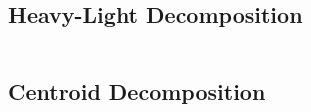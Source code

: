 
\subsection{Heavy-Light Decomposition} %
\inputminted{cpp}{src/Trees/hld.cpp}

\subsection{Centroid Decomposition}
\inputminted{cpp}{src/Trees/centroid.cpp}